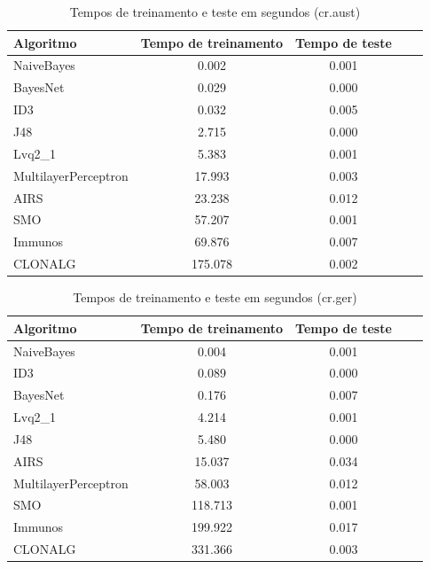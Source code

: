 \begin{table}[h!]
    \centering
    \caption{Tempos de treinamento e teste em segundos (cr.aust)}
    \label{tbl:dev_table_aust_times}
    \vspace{0.5cm}
    \begin{tabular}{|l|c|c|c|c|}
        \hline
        \textbf{Algoritmo} & \textbf{Tempo de treinamento} & \textbf{Tempo de teste} \\
        \hline
        \rowcolor[gray]{.9}
        NaiveBayes           &   0.002 & 0.001 \\ \hline
        \rowcolor[gray]{.9}
        BayesNet             &   0.029 & 0.000 \\ \hline
        \rowcolor[gray]{.9}
        ID3                  &   0.032 & 0.005 \\ \hline
        J48                  &   2.715 & 0.000 \\ \hline
        Lvq2\_1              &   5.383 & 0.001 \\ \hline
        MultilayerPerceptron &  17.993 & 0.003 \\ \hline
        AIRS                 &  23.238 & 0.012 \\ \hline
        SMO                  &  57.207 & 0.001 \\ \hline
        Immunos              &  69.876 & 0.007 \\ \hline
        CLONALG              & 175.078 & 0.002 \\ \hline
    \end{tabular}
\end{table}

\begin{table}[h!]
    \centering
    \caption{Tempos de treinamento e teste em segundos (cr.ger)}
    \label{tbl:dev_table_ger_times}
    \label{tbl:dev_table_last}
    \vspace{0.5cm}
    \begin{tabular}{|l|c|c|c|c|}
        \hline
        \textbf{Algoritmo} & \textbf{Tempo de treinamento} & \textbf{Tempo de teste} \\
        \hline
        \rowcolor[gray]{.9}
        NaiveBayes           &   0.004 & 0.001 \\ \hline
        \rowcolor[gray]{.9}
        ID3                  &   0.089 & 0.000 \\ \hline
        \rowcolor[gray]{.9}
        BayesNet             &   0.176 & 0.007 \\ \hline
        Lvq2\_1              &   4.214 & 0.001 \\ \hline
        J48                  &   5.480 & 0.000 \\ \hline
        AIRS                 &  15.037 & 0.034 \\ \hline
        MultilayerPerceptron &  58.003 & 0.012 \\ \hline
        SMO                  & 118.713 & 0.001 \\ \hline
        Immunos              & 199.922 & 0.017 \\ \hline
        CLONALG              & 331.366 & 0.003 \\ \hline
    \end{tabular}
\end{table}

